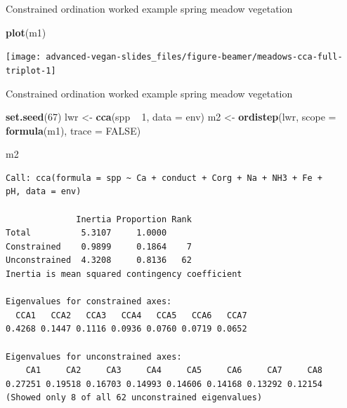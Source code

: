 \documentclass[10pt,ignorenonframetext,compress, aspectratio=169]{beamer}
\newenvironment{Shaded}{\begin{snugshade}}{\end{snugshade}}
\newcommand{\KeywordTok}[1]{\textcolor[rgb]{0.13,0.29,0.53}{\textbf{{#1}}}}
\newcommand{\DataTypeTok}[1]{\textcolor[rgb]{0.13,0.29,0.53}{{#1}}}
\newcommand{\DecValTok}[1]{\textcolor[rgb]{0.00,0.00,0.81}{{#1}}}
\newcommand{\StringTok}[1]{\textcolor[rgb]{0.31,0.60,0.02}{{#1}}}
\newcommand{\OtherTok}[1]{\textcolor[rgb]{0.56,0.35,0.01}{{#1}}}
\newcommand{\NormalTok}[1]{{#1}}
\begin{document}
\begin{frame}[fragile]{Constrained ordination worked example \textbar{}
spring meadow vegetation}

\scriptsize

\begin{Shaded}
\begin{Highlighting}[]
\KeywordTok{plot}\NormalTok{(m1)}
\end{Highlighting}
\end{Shaded}

\begin{center}\texttt{[image: advanced-vegan-slides\_files/figure-beamer/meadows-cca-full-triplot-1]} \end{center}

\normalsize

\end{frame}

\begin{frame}[fragile]{Constrained ordination worked example \textbar{}
spring meadow vegetation}

\tiny

\begin{Shaded}
\begin{Highlighting}[]
\KeywordTok{set.seed}\NormalTok{(}\DecValTok{67}\NormalTok{)}
\NormalTok{lwr <-}\StringTok{ }\KeywordTok{cca}\NormalTok{(spp ~}\StringTok{ }\DecValTok{1}\NormalTok{, }\DataTypeTok{data =} \NormalTok{env)}
\NormalTok{m2 <-}\StringTok{ }\KeywordTok{ordistep}\NormalTok{(lwr, }\DataTypeTok{scope =} \KeywordTok{formula}\NormalTok{(m1), }\DataTypeTok{trace =} \OtherTok{FALSE}\NormalTok{)}
\end{Highlighting}
\end{Shaded}

\begin{Shaded}
\begin{Highlighting}[]
\NormalTok{m2}
\end{Highlighting}
\end{Shaded}

\begin{verbatim}
Call: cca(formula = spp ~ Ca + conduct + Corg + Na + NH3 + Fe +
pH, data = env)

              Inertia Proportion Rank
Total          5.3107     1.0000     
Constrained    0.9899     0.1864    7
Unconstrained  4.3208     0.8136   62
Inertia is mean squared contingency coefficient 

Eigenvalues for constrained axes:
  CCA1   CCA2   CCA3   CCA4   CCA5   CCA6   CCA7 
0.4268 0.1447 0.1116 0.0936 0.0760 0.0719 0.0652 

Eigenvalues for unconstrained axes:
    CA1     CA2     CA3     CA4     CA5     CA6     CA7     CA8 
0.27251 0.19518 0.16703 0.14993 0.14606 0.14168 0.13292 0.12154 
(Showed only 8 of all 62 unconstrained eigenvalues)
\end{verbatim}

\normalsize

\end{frame}
\end{document}
